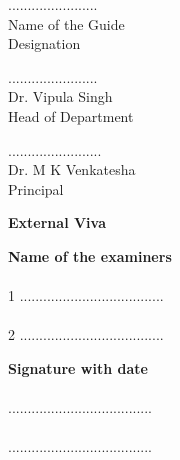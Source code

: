 \vspace{1.5cm}
\begin{minipage}[t]{0.3\textwidth}%
.......................\\
{\color{red}Name of the Guide}\\
Designation\\
\end{minipage}\hspace{0.06cm}
\begin{minipage}[t]{0.3\textwidth}%
.......................\\
{\color{red}Dr. Vipula Singh}\\
Head of Department\\
\end{minipage}
\begin{minipage}[t]{0.3\textwidth}%
........................\\
{\color{red}Dr. M K Venkatesha}\\
Principal\\
\end{minipage}

\begin{center}
	\textbf{{\color{blue}External Viva}}
\end{center}

\vspace{0.5cm}
\begin{minipage}[t]{0.6\textwidth}%
\textbf{Name of the examiners}\\\\
1 .....................................\\
\\
2 .....................................\\
\end{minipage}\hspace{0.06cm}
\begin{minipage}[t]{0.6\textwidth}%
\textbf{Signature with date}\\\\
.....................................\\
\\
.....................................\\
\end{minipage}
